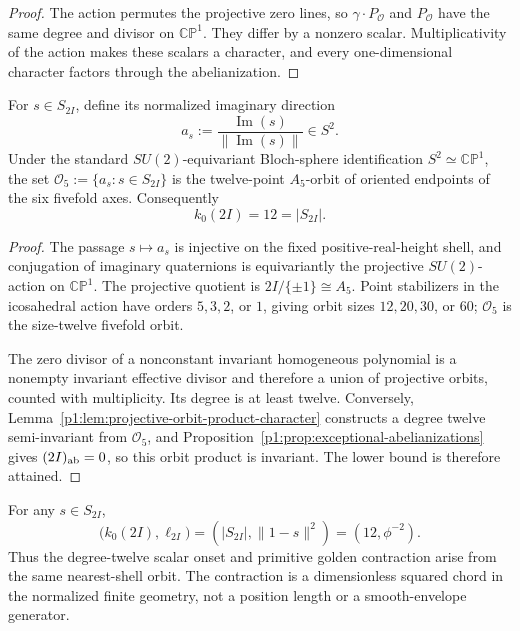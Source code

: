 \documentclass[11pt]{article}
\begin{document}
\begin{proof}
The action permutes the projective zero lines, so
\(\gamma\cdot P_{\mathcal O}\) and \(P_{\mathcal O}\) have the same degree
and divisor on \(\mathbb {CP}^1\).  They differ by a nonzero scalar.
Multiplicativity of the action makes these scalars a character, and every
one-dimensional character factors through the abelianization.
\end{proof}

\begin{theorem}
\label{p1:thm:2I-shell-degree-twelve}
For \(s\in S_{2I}\), define its normalized imaginary direction
\[
 a_s:=\frac{\operatorname{Im}(s)}{\|\operatorname{Im}(s)\|}\in S^2.
\]
Under the standard \(SU(2)\)-equivariant Bloch-sphere identification
\(S^2\simeq\mathbb {CP}^1\), the set
\(\mathcal O_5:=\{a_s:s\in S_{2I}\}\) is the twelve-point \(A_5\)-orbit of
oriented endpoints of the six fivefold axes.  Consequently
\begin{equation}
\label{p1:eq:2I-shell-degree-twelve}
 \boxed{k_0(2I)=12=|S_{2I}|.}
\end{equation}
\end{theorem}

\begin{proof}
The passage \(s\mapsto a_s\) is injective on the fixed positive-real-height
shell, and conjugation of imaginary quaternions is equivariantly the
projective \(SU(2)\)-action on \(\mathbb {CP}^1\).  The projective quotient is
\(2I/\{\pm1\}\cong A_5\).  Point stabilizers in the icosahedral action have
orders \(5,3,2\), or \(1\), giving orbit sizes \(12,20,30\), or \(60\);
\(\mathcal O_5\) is the size-twelve fivefold orbit.

The zero divisor of a nonconstant invariant homogeneous polynomial is a
nonempty invariant effective divisor and therefore a union of projective
orbits, counted with multiplicity.  Its degree is at least twelve.  Conversely,
Lemma~\ref{p1:lem:projective-orbit-product-character} constructs a degree
twelve semi-invariant from \(\mathcal O_5\), and
Proposition~\ref{p1:prop:exceptional-abelianizations} gives
\((2I)_{\rm ab}=0\), so this orbit product is invariant.  The lower bound is
therefore attained.
\end{proof}

\begin{corollary}
\label{p1:cor:2I-one-shell-datum}
For any \(s\in S_{2I}\),
\begin{equation}
\label{p1:eq:2I-one-shell-datum}
 \boxed{\bigl(k_0(2I),\ell_{2I}\bigr)
 =\left(|S_{2I}|,\|1-s\|^2\right)
 =(12,\phi^{-2}).}
\end{equation}
Thus the degree-twelve scalar onset and primitive golden contraction arise
from the same nearest-shell orbit.  The contraction is a dimensionless
squared chord in the normalized finite geometry, not a position
length or a smooth-envelope generator.
\end{corollary}
\end{document}
